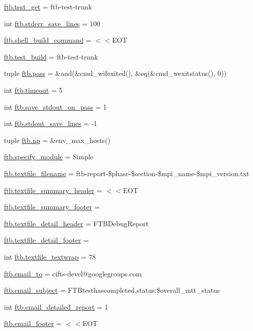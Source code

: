\begin{DoxyCompactItemize}
\item 
\hyperlink{namespaceftb_a7e0cbd6a960d7a066181ef774535b781}{ftb.\-test\-\_\-get} = ftb-\/test-\/trunk
\item 
int \hyperlink{namespaceftb_ae4dc745f3cad7888d7b0ec6f707dd987}{ftb.\-stderr\-\_\-save\-\_\-lines} = 100
\item 
\hyperlink{namespaceftb_a52b04761ebaaf1f84781e8767994b72a}{ftb.\-shell\-\_\-build\-\_\-command} = $<$$<$E\-O\-T
\item 
\hyperlink{namespaceftb_a956fe10ace4560b67e71bd1952c74dd3}{ftb.\-test\-\_\-build} = ftb-\/test-\/trunk
\item 
tuple \hyperlink{namespaceftb_a6835e8ccf2dcf3a64662b94ab7dc21dc}{ftb.\-pass} = \&and(\&cmd\-\_\-wifexited(), \&eq(\&cmd\-\_\-wexitstatus(), 0))
\item 
int \hyperlink{namespaceftb_af4129b964c3298abd3b378dc8c5f5321}{ftb.\-timeout} = 5
\item 
int \hyperlink{namespaceftb_ae7093ee70b2bbcabcc07887556559782}{ftb.\-save\-\_\-stdout\-\_\-on\-\_\-pass} = 1
\item 
int \hyperlink{namespaceftb_a0323281cbf8bed3a87bcf74ffe8a4944}{ftb.\-stdout\-\_\-save\-\_\-lines} = -\/1
\item 
tuple \hyperlink{namespaceftb_a98d035fcaf3e0ad500d4398f3175857c}{ftb.\-np} = \&env\-\_\-max\-\_\-hosts()
\item 
\hyperlink{namespaceftb_addf629fca64be87df63ed74143701d64}{ftb.\-specify\-\_\-module} = Simple
\item 
\hyperlink{namespaceftb_aeffc0ba718912c9454faca1507b2e327}{ftb.\-textfile\-\_\-filename} = ftb-\/report-\/\$phase-\/\$section-\/\$mpi\-\_\-name-\/\$mpi\-\_\-version.\-txt
\item 
\hyperlink{namespaceftb_a7d7d4c6685484abf921270e3427670e8}{ftb.\-textfile\-\_\-summary\-\_\-header} = $<$$<$E\-O\-T
\item 
\hyperlink{namespaceftb_af90084a3047b905a789299e4621983f4}{ftb.\-textfile\-\_\-summary\-\_\-footer} =
\item 
\hyperlink{namespaceftb_a1c9c073a1fdb526fd58eca74cc6012a2}{ftb.\-textfile\-\_\-detail\-\_\-header} = F\-T\-B\-Debug\-Report
\item 
\hyperlink{namespaceftb_a16b758d8bc177b624ed4801c0dea55c8}{ftb.\-textfile\-\_\-detail\-\_\-footer} =
\item 
int \hyperlink{namespaceftb_a5be38c1bd9675f6ab63cbe757193526d}{ftb.\-textfile\-\_\-textwrap} = 78
\item 
\hyperlink{namespaceftb_af77d6a2460d34d47c8aa42d7d72c0100}{ftb.\-email\-\_\-to} = cifts-\/devel@googlegroups.\-com
\item 
\hyperlink{namespaceftb_a32d4c73434de192cc67e8c20def937a8}{ftb.\-email\-\_\-subject} = F\-T\-Btesthascompleted,status\-:\$overall\-\_\-mtt\-\_\-status
\item 
int \hyperlink{namespaceftb_a0a227d10a4a01aa6ddc866a696d7b0b1}{ftb.\-email\-\_\-detailed\-\_\-report} = 1
\item 
\hyperlink{namespaceftb_a1945f3f78c2c8a76e10e5c6b6ab49edc}{ftb.\-email\-\_\-footer} = $<$$<$E\-O\-T
\end{DoxyCompactItemize}
